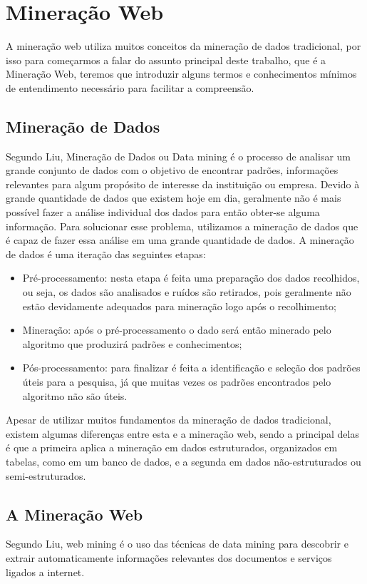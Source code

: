 \chapter{Mineração Web}
A mineração web utiliza muitos conceitos da mineração de dados tradicional, por isso para começarmos a falar do assunto principal deste trabalho, que é a Mineração Web, teremos que introduzir alguns termos e conhecimentos mínimos de entendimento necessário para facilitar a compreensão.

\section{Mineração de Dados}

	Segundo Liu\cite{BingLiu}, Mineração de Dados ou Data mining é o processo de analisar um grande conjunto de dados com o objetivo de encontrar padrões, informações relevantes para algum propósito de interesse da instituição ou empresa. Devido à grande quantidade de dados que existem hoje em dia, geralmente não é mais possível fazer a análise individual dos dados para então obter-se alguma informação. Para solucionar esse problema, utilizamos a mineração de dados  que é capaz de fazer essa análise em uma grande quantidade de dados. A mineração de dados é uma iteração das seguintes etapas:

\begin{itemize}
\item 	Pré-processamento: nesta etapa é feita uma preparação dos dados recolhidos, ou seja, os dados são analisados e ruídos são retirados, pois geralmente não estão devidamente adequados para mineração logo após o recolhimento;
\item 	Mineração: após o pré-processamento o dado será então minerado pelo algoritmo que produzirá padrões e conhecimentos;
\item  	Pós-processamento: para finalizar é feita a identificação e seleção dos padrões úteis para a pesquisa, já que muitas vezes os padrões encontrados pelo algoritmo não são úteis.
\end{itemize}

Apesar de utilizar muitos fundamentos da mineração de dados tradicional, existem algumas diferenças entre esta e a mineração web, sendo a principal delas é que a primeira aplica a mineração em dados estruturados, organizados em tabelas, como em um banco de dados, e a segunda em dados não-estruturados ou semi-estruturados.


\section{A Mineração Web}
	Segundo Liu\cite{BingLiu}, web mining é o uso das técnicas de data mining para descobrir e extrair automaticamente informações relevantes dos documentos e serviços ligados a internet.

